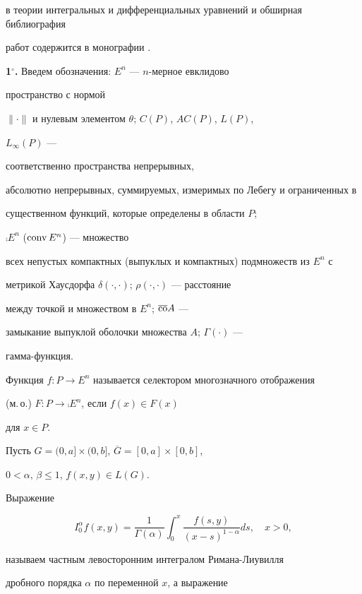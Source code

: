 в теории интегральных и дифференциальных уравнений и обширная библиография 


работ содержится в монографии \cite{Sam}. 


 


{\bf 1${}^\circ$.} Введем обозначения: $E^n$ --- $n$-мерное евклидово 


пространство с нормой 


$\|\cdot\|$ и нулевым элементом $\theta$; $C(P)$, $AC(P)$, $L(P)$, 


$L_\infty(P)$ --- 


соответственно пространства непрерывных, 


абсолютно непрерывных, суммируемых, измеримых по Лебегу и ограниченных в 


существенном функций, которые определены в области $P$; 


$\comp E^n$ ($\operatorname{conv} E^n$) --- множество 


всех непустых компактных (выпуклых и компактных) подмножеств из $E^n$ с 


метрикой Хаусдорфа $\delta(\cdot,\cdot)$; $\rho(\cdot,\cdot)$ --- расстояние 


между точкой и множеством в $E^n$; $\overline{\operatorname{co}}A$ --- 


замыкание выпуклой оболочки множества $A$; $\Gamma(\cdot)$ --- 


гамма-функция. 


Функция $f:P\to E^n$ называется селектором многозначного отображения 


(м.\,о.) $F:P\to\comp E^n$, если $f(x)\in F(x)$ 


для $x\in P$. 


 


Пусть $G=(0,a]\times(0,b]$, $\overline G=[0,a]\times[0,b]$, 


$0<\alpha,\,\beta\le 1$, $f(x,y)\in L(G)$. 


Выражение 


\begin{equation} 


I_0^\alpha f(x,y)=\frac{1}{\Gamma(\alpha)}\int^x_0 


\frac{f(s,y)}{(x-s)^{1-\alpha}}ds,\quad x>0, 


\end{equation} 


называем \cite{Sam} частным левосторонним интегралом Римана-Лиувилля 


дробного порядка $\alpha$ по переменной $x$, а выражение 


